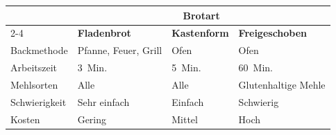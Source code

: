 \begin{tabular}{@{}llll@{}}
\toprule
                    &             \multicolumn{3}{c}{\textbf{Brotart}}\\
                                  \cmidrule(lll){2-4}
                    & \textbf{Fladenbrot}       & \textbf{Kastenform} &  \textbf{Freigeschoben} \\ \midrule
Backmethode      & Pfanne, Feuer, Grill & Ofen              & Ofen                    \\
Arbeitszeit        & 3~Min.              & 5~Min.            & 60~Min.                 \\
Mehlsorten         & Alle                 & Alle               & Glutenhaltige Mehle           \\
Schwierigkeit          & Sehr einfach           & Einfach              & Schwierig               \\
Kosten                & Gering                 & Mittel            & Hoch                    \\ \bottomrule
\end{tabular}
